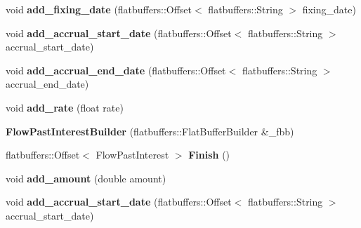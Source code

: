 \begin{DoxyCompactItemize}
void {\bfseries add\+\_\+fixing\+\_\+date} (flatbuffers\+::\+Offset$<$ flatbuffers\+::\+String $>$ fixing\+\_\+date)
\item 
\mbox{\label{structquantra_1_1FlowPastInterestBuilder_a833df436fc638950e6ea6f4231adad65}} 
void {\bfseries add\+\_\+accrual\+\_\+start\+\_\+date} (flatbuffers\+::\+Offset$<$ flatbuffers\+::\+String $>$ accrual\+\_\+start\+\_\+date)
\item 
\mbox{\label{structquantra_1_1FlowPastInterestBuilder_a8b5f6d57170526e4e2dc38e0b0864196}} 
void {\bfseries add\+\_\+accrual\+\_\+end\+\_\+date} (flatbuffers\+::\+Offset$<$ flatbuffers\+::\+String $>$ accrual\+\_\+end\+\_\+date)
\item 
\mbox{\label{structquantra_1_1FlowPastInterestBuilder_a77f2d659532b9504b97b24d8ff7d9d49}} 
void {\bfseries add\+\_\+rate} (float rate)
\item 
\mbox{\label{structquantra_1_1FlowPastInterestBuilder_a01ab89dddcba7e96fcc8a8625b57f8b7}} 
{\bfseries Flow\+Past\+Interest\+Builder} (flatbuffers\+::\+Flat\+Buffer\+Builder \&\+\_\+fbb)
\item 
\mbox{\label{structquantra_1_1FlowPastInterestBuilder_a969d3272b1a5281a15cba0c526065a04}} 
flatbuffers\+::\+Offset$<$ Flow\+Past\+Interest $>$ {\bfseries Finish} ()
\item 
\mbox{\label{structquantra_1_1FlowPastInterestBuilder_abfb3f1094cdfea213e7781eda63bcbbb}} 
void {\bfseries add\+\_\+amount} (double amount)
\item 
\mbox{\label{structquantra_1_1FlowPastInterestBuilder_a833df436fc638950e6ea6f4231adad65}} 
void {\bfseries add\+\_\+accrual\+\_\+start\+\_\+date} (flatbuffers\+::\+Offset$<$ flatbuffers\+::\+String $>$ accrual\+\_\+start\+\_\+date)
\item 
\mbox{\label{structquantra_1_1FlowPastInterestBuilder_a8b5f6d57170526e4e2dc38e0b0864196}} 

\end{DoxyCompactItemize}
